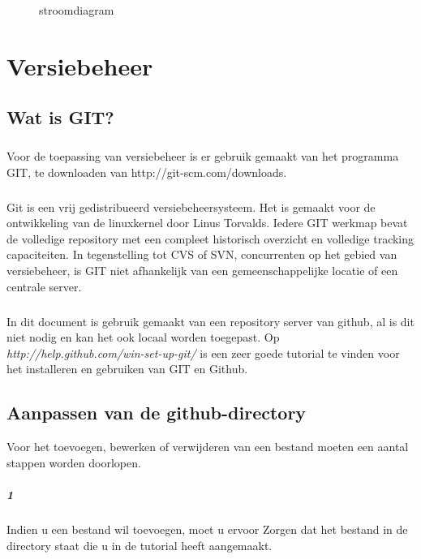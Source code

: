 \documentclass[12pt,a4paper]{report}
\begin{document}
\begin{flushleft}
\begin{figure}[H]
\centering 
\vspace{-10pt}
\caption{stroomdiagram}
\end{figure}

\chapter{Versiebeheer}
\section{Wat is GIT?}
\paragraph*{}
Voor de toepassing van versiebeheer is er gebruik gemaakt van het programma GIT, te downloaden van http://git-scm.com/downloads.
\paragraph*{}
Git is een vrij gedistribueerd versiebeheersysteem. Het is gemaakt voor de ontwikkeling van de linuxkernel door Linus Torvalds. Iedere GIT werkmap bevat de volledige repository met een compleet historisch overzicht en volledige tracking capaciteiten. In tegenstelling tot CVS of SVN, concurrenten op het gebied van versiebeheer, is GIT niet afhankelijk van een gemeenschappelijke locatie of een centrale server.
\paragraph*{}
In dit document is gebruik gemaakt van een repository server van github, al is dit niet nodig en kan het ook locaal worden toegepast.
Op \textit{http://help.github.com/win-set-up-git/} is een zeer goede tutorial te vinden voor het installeren en gebruiken van GIT en Github.
\section{Aanpassen van de github-directory}
Voor het toevoegen, bewerken of verwijderen van een bestand moeten een aantal stappen worden doorlopen.
\paragraph*{1}
Indien u een bestand wil toevoegen, moet u ervoor Zorgen dat het bestand in de directory staat die u in de tutorial heeft aangemaakt.

\end{flushleft}
\end{document}
